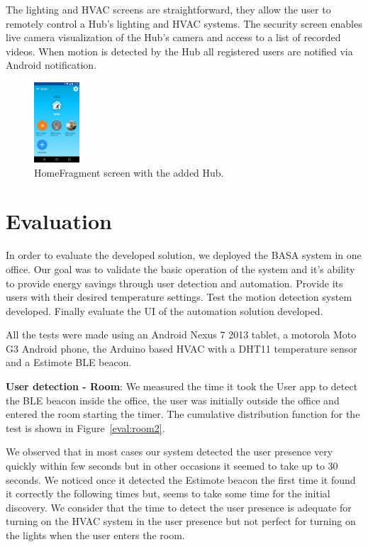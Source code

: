 \documentclass[conference]{IEEEtran}
\begin{document}
The lighting and \ac{HVAC} screens are straightforward, they allow the user to remotely control a Hub's lighting and \ac{HVAC} systems. The security screen enables live camera visualization of the Hub's camera and access to a list of recorded videos. When motion is detected by the Hub all registered users are notified via Android notification. 


\begin{figure}[h]
\centering
\includegraphics[width=0.15\textwidth]{Figures/imp_home_user_app}
\caption{HomeFragment screen with the added Hub.}
\label{imp_user_app}
\end{figure}


\section{Evaluation}

In order to evaluate the developed solution, we deployed the BASA system in one office. Our goal was to validate the basic operation  of the system and it's ability to provide energy savings through user detection and automation. Provide its users with their desired temperature settings. Test the motion detection system developed. Finally evaluate the \ac{UI} of the automation solution developed.

All the tests were made using an Android Nexus 7 2013 tablet, a motorola Moto G3 Android phone, the Arduino based HVAC with a DHT11 temperature sensor and a Estimote BLE beacon.

\textbf{User detection - Room}: We measured the time it took the User app to detect the BLE beacon inside the office, the user was initially outside the office and entered the room starting the timer. The cumulative distribution function for the test is shown in Figure~\ref{eval:room2}.

We observed that in most cases our system detected the user presence very quickly within few seconds but in other occasions it seemed to take up to 30 seconds. We noticed once it detected the Estimote beacon the first time it found it correctly the following times but, seems to take some time for the initial discovery. We consider that the time to detect the user presence is adequate for turning on the \ac{HVAC} system in the user presence but not perfect for turning on the lights when the user enters the room.
\end{document}
